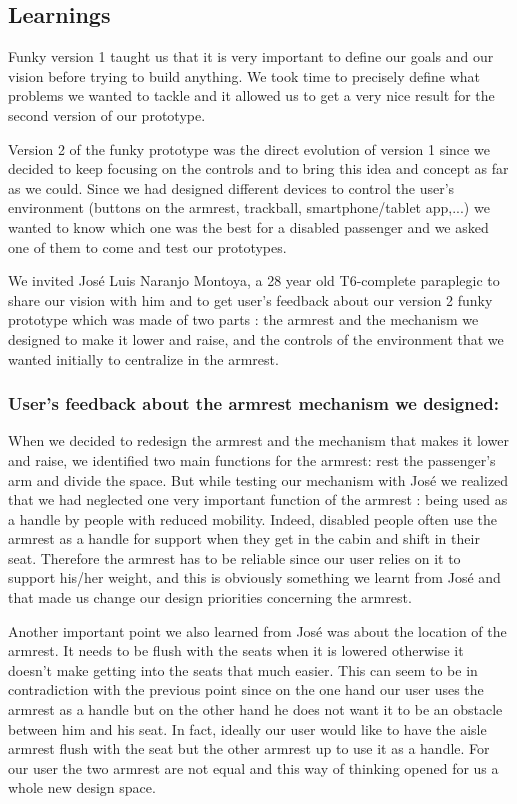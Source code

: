 \subsection{Learnings}

Funky version 1 taught us that it is very important to define our goals and our vision before trying to build anything. We took time to precisely define what problems we wanted to tackle and it allowed us to get a very nice result for the second version of our prototype.

Version 2 of the funky prototype was the direct evolution of version 1 since we decided to keep focusing on the controls and to bring this idea and concept as far as we could. Since we had designed different devices to control the user's environment (buttons on the armrest, trackball, smartphone/tablet app,...) we wanted to know which one was the best for a disabled passenger and we asked one of them to come and test our prototypes.

We invited José Luis Naranjo Montoya, a 28 year old T6-complete paraplegic to share our vision with him and to get user's feedback about our version 2 funky prototype which was made of two parts : the armrest and the mechanism we designed to make it lower and raise, and the controls of the environment that we wanted initially to centralize in the armrest.

\subsubsection*{User's feedback about the armrest mechanism we designed:}

When we decided to redesign the armrest and the mechanism that makes it lower and raise, we identified two main functions for the armrest: rest the passenger's arm and divide the space. But while testing our mechanism with José we realized that we had neglected one very important function of the armrest : being used as a handle by people with reduced mobility. Indeed, disabled people often use the armrest as a handle for support when they get in the cabin and shift in their seat. Therefore the armrest has to be reliable since our user relies on it to support his/her weight, and this is obviously something we learnt from José and that made us change our design priorities concerning the armrest.

Another important point we also learned from José was about the location of the armrest. It needs to be flush with the seats when it is lowered otherwise it doesn't make getting into the seats that much easier. This can seem to be in contradiction with the previous point since on the one hand our user uses the armrest as a handle but on the other hand he does not want it to be an obstacle between him and his seat. In fact, ideally our user would like to have the aisle armrest flush with the seat but the other armrest up to use it as a handle. For our user the two armrest are not equal and this way of thinking opened for us a whole new design space. 


